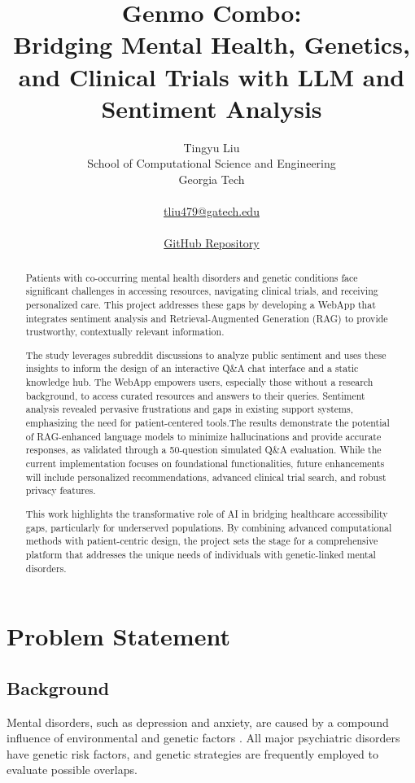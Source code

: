 \documentclass{article} %
\title{Genmo Combo:\\
Bridging Mental Health, Genetics, and Clinical Trials with LLM and Sentiment Analysis
}
\author{Tingyu Liu\\ School of Computational Science and Engineering\\Georgia Tech\\ \\  \url{tliu479@gatech.edu} \\ \\ \href{https://github.com/taraliu23/Turmerik-MLE-Takehome}{GitHub Repository}}
\begin{document}
\maketitle

\begin{abstract}
Patients with co-occurring mental health disorders and genetic conditions face significant challenges in accessing resources, navigating clinical trials, and receiving personalized care. This project addresses these gaps by developing a WebApp that integrates sentiment analysis and Retrieval-Augmented Generation (RAG) to provide trustworthy, contextually relevant information.

The study leverages subreddit discussions to analyze public sentiment and uses these insights to inform the design of an interactive Q&A chat interface and a static knowledge hub. The WebApp empowers users, especially those without a research background, to access curated resources and answers to their queries. Sentiment analysis revealed pervasive frustrations and gaps in existing support systems, emphasizing the need for patient-centered tools.The results demonstrate the potential of RAG-enhanced language models to minimize hallucinations and provide accurate responses, as validated through a 50-question simulated Q&A evaluation. While the current implementation focuses on foundational functionalities, future enhancements will include personalized recommendations, advanced clinical trial search, and robust privacy features.

This work highlights the transformative role of AI in bridging healthcare accessibility gaps, particularly for underserved populations. By combining advanced computational methods with patient-centric design, the project sets the stage for a comprehensive platform that addresses the unique needs of individuals with genetic-linked mental disorders.

\end{abstract}

\section{Problem Statement}

\subsection{Background}


Mental disorders, such as depression and anxiety, are caused by a compound influence of environmental and genetic factors \citep{alshaya2022depression}. All major psychiatric disorders have genetic risk factors, and genetic strategies are frequently employed to evaluate possible overlaps. 
\end{document}
